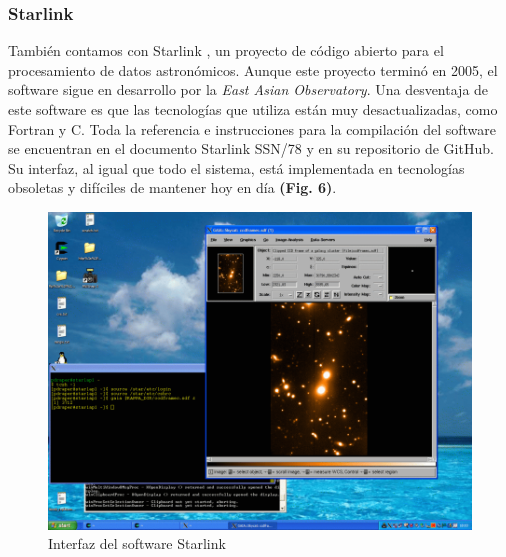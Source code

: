\documentclass[9pt,twocolumn,a4paper]{opticajnl}
\begin{document}
\subsubsection*{Starlink}
También contamos con Starlink \cite{Berry_Starlink}, un proyecto de código abierto para el procesamiento de datos astronómicos. Aunque este proyecto terminó en 2005, el software sigue en desarrollo por la \textit{East Asian Observatory}. Una desventaja de este software es que las tecnologías que utiliza están muy desactualizadas, como Fortran y C. Toda la referencia e instrucciones para la compilación del software se encuentran en el documento Starlink SSN/78 y en su repositorio de GitHub. Su interfaz, al igual que todo el sistema, está implementada en tecnologías obsoletas y difíciles de mantener hoy en día \textbf{(Fig. 6)}.
\begin{figure}
	\centering
	\includegraphics[width=0.8\linewidth]{starlinkcap}
	\caption{Interfaz del software Starlink}
	\label{fig:starlinkcap}
\end{figure}
\end{document}
